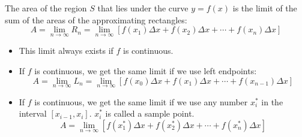 \begin{frame}
\begin{definition}
The area of the region $S$ that lies under the curve $y = f(x)$ is the limit of the sum of the areas of the approximating rectangles:
\abovedisplayskip=0pt
\belowdisplayskip=0pt
\[
A = \lim_{n\to\infty} R_n = \lim_{n\to\infty} [ f(x_1)\Delta x + f(x_2) \Delta x + \cdots + f(x_n) \Delta x]
\]
\end{definition}
\begin{itemize}
\item<2->  This limit always exists if $f$ is continuous.
\item<3->  If $f$ is continuous, we get the same limit if we use left endpoints:
\abovedisplayskip=0pt
\belowdisplayskip=0pt
\[
A = \lim_{n\to\infty} L_n = \lim_{n\to\infty} [ f(x_0)\Delta x + f(x_1) \Delta x + \cdots + f(x_{n-1}) \Delta x]
\]
\item<4->  If $f$ is continuous, we get the same limit if we use any number $x_i^*$ in the interval $[x_{i-1},x_i]$.  $x_i^*$ is called a sample point.
\abovedisplayskip=0pt
\belowdisplayskip=0pt
\[
A = \lim_{n\to\infty} [ f(x_1^*)\Delta x + f(x_2^*) \Delta x + \cdots + f(x_{n}^*) \Delta x]
\]
\end{itemize}
%
\end{frame}
